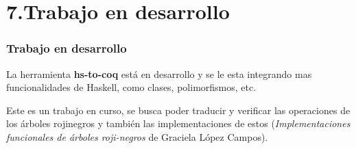 \documentclass[xcolor=dvipsnames,table,handout]{beamer}
\begin{document}
\section{7.Trabajo en desarrollo}
\begin{frame}
  \frametitle{Trabajo en desarrollo}
  La herramienta \textbf{hs-to-coq} est\'a en desarrollo y se le esta
integrando mas funcionalidades de Haskell, como clases, polimorfismos, etc.

\vspace*{10pt}

  Este es un trabajo en curso, se busca poder traducir y verificar
  las operaciones de los \'arboles rojinegros y tambi\'en las implementaciones
  de estos (\textit{Implementaciones funcionales de árboles roji-negros} de
  Graciela López Campos).

\end{frame}
\end{document}
